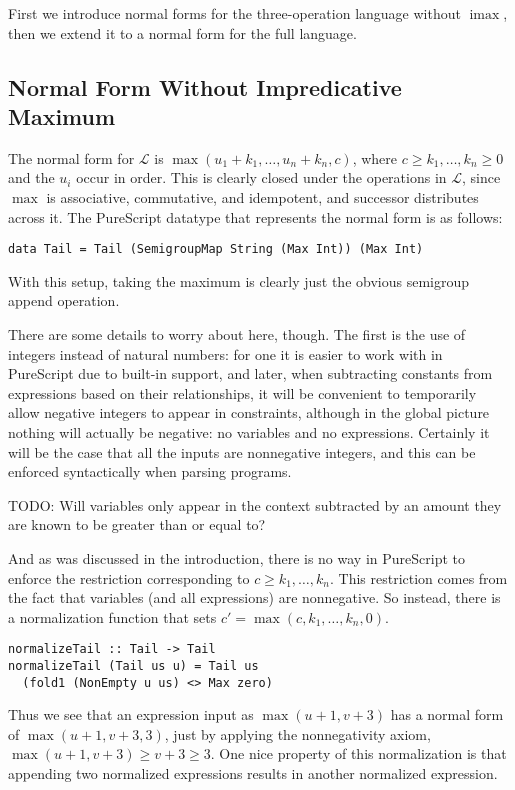 \documentclass[11pt, twoside, reqno]{book}
\DeclareMathOperator{\imax}{imax}
\begin{document}
First we introduce normal forms for the three-operation language without \(\imax\), then we extend it to a normal form for the full language.

\subsection{Normal Form Without Impredicative Maximum}

The normal form for \(\mathcal{L}\) is \(\max(u_1 + k_1, \dots, u_n + k_n, c)\), where \(c \ge k_1, \dots, k_n \ge 0\) and the \(u_i\) occur in order.
This is clearly closed under the operations in \(\mathcal{L}\), since \(\max\) is associative, commutative, and idempotent, and successor distributes across it.
The PureScript datatype that represents the normal form is as follows:
\begin{verbatim}
data Tail = Tail (SemigroupMap String (Max Int)) (Max Int)
\end{verbatim}
With this setup, taking the maximum is clearly just the obvious semigroup append operation.

There are some details to worry about here, though.
The first is the use of integers instead of natural numbers:
for one it is easier to work with in PureScript due to built-in support,
and later, when subtracting constants from expressions based on their relationships,
it will be convenient to temporarily allow negative integers to appear in constraints, although in the global picture nothing will actually be negative: no variables and no expressions.
Certainly it will be the case that all the inputs are nonnegative integers, and this can be enforced syntactically when parsing programs.

TODO: Will variables only appear in the context subtracted by an amount they are known to be greater than or equal to?

And as was discussed in the introduction, there is no way in PureScript to enforce the restriction corresponding to \(c \ge k_1, \dots, k_n\).
This restriction comes from the fact that variables (and all expressions) are nonnegative.
So instead, there is a normalization function that sets \(c\prime = \max(c, k_1, \dots, k_n, 0)\).
\begin{verbatim}
normalizeTail :: Tail -> Tail
normalizeTail (Tail us u) = Tail us
  (fold1 (NonEmpty u us) <> Max zero)
\end{verbatim}
Thus we see that an expression input as \(\max(u+1, v+3)\) has a normal form of \(\max(u+1, v+3, 3)\), just by applying the nonnegativity axiom, \(\max(u+1, v+3) \ge v+3 \ge 3\).
One nice property of this normalization is that appending two normalized expressions results in another normalized expression.
\end{document}
